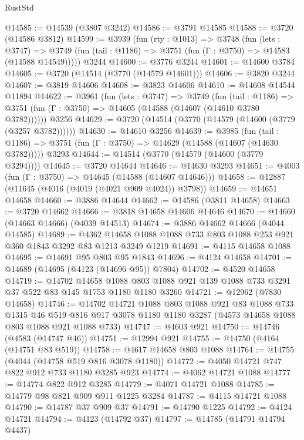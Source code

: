 \begin{lexlean}{RustStd}
\begin{coremodule}
@14585 := @14539 (@3807 @3242)
@14586 := @3791 @14585
@14588 := @3720 (@14586 @3812)
@14599 := @3939
    (fun (rty : @1013) =>
    @3748
      (fun (lets : @3747) =>
      @3749 (fun (tail : @1186) => @3751 (fun (Γ : @3750) => @14583 (@14588 @14549)))))
    @3244
@14600 := @3776 @3244
@14601 := @14600 @3784
@14605 := @3720 (@14514 (@3770 (@14579 @14601)))
@14606 := @3820 @3244
@14607 := @3819 @14606
@14608 := @3823 @14606
@14610 := @14608 @14544 @11894
@14622 := @3961
    (fun (lets : @3747) =>
    @3749
      (fun (tail : @1186) =>
      @3751 (fun (Γ : @3750) => @14605 (@14588 (@14607 (@14610 @3780 @3782))))))
    @3256
@14629 := @3720 (@14514 (@3770 (@14579 (@14600 (@3779 (@3257 @3782))))))
@14630 := @14610 @3256
@14639 := @3985
    (fun (tail : @1186) => @3751 (fun (Γ : @3750) => @14629 (@14588 (@14607 (@14630 @3782)))))
    @3293
@14644 := @14514 (@3770 (@14579 (@14600 (@3779 @3294))))
@14645 := @3720 @14644
@14646 := @14630 @3293
@14651 := @4003 (fun (Γ : @3750) => @14645 (@14588 (@14607 @14646)))
@14658 := @12887 (@11645 (@4016 (@4019 (@4021 @909 @4024)) @3798))
@14659 := @14651 @14658
@14660 := @3886 @14644
@14662 := @14586 (@3811 @14658)
@14663 := @3720 @14662
@14666 := @3818 @14658 @14606 @14646
@14670 := @14660 (@14663 @14666) (@4039 @14513)
@14674 := @3886 @14662 @14666 (@4044 @14585)
@14689 := @4362 @14658 @1088 @1088 @733 @803 @1088 @253 @921 @360 @1843 @3292 @83 @1213 @3249 @1219
@14691 := @4115 @14658 @1088
@14695 := @14691 @95 @803 @95 @1843
@14696 := @4124 @14658
@14701 := @14689 (@14695 (@4123 (@14696 @95)) @7804)
@14702 := @4520 @14658
@14719 := @14702
    @14658
    @1088
    @803
    @1088
    @921
    @139
    @1088
    @733
    @3291
    @37
    @522
    @83
    @145
    @1753
    @1180
    @1180
    @3260
@14721 := @12962 (@7830 @14658)
@14746 := @14702
    @14721
    @1088
    @803
    @1088
    @921
    @83
    @1088
    @733
    @1315
    @46
    @519
    @816
    @917
    @3078
    @1180
    @1180
    @3287
    (@4573 @14658 @1088 @803 @1088 @921 @1088 @733)
@14747 := @4603 @921
@14750 := @14746 (@4583 (@14747 @46))
@14751 := @12994 @921
@14755 := @14750 (@4164 (@14751 @83 @519))
@14758 := @4617 @14658 @803 @1088
@14764 := @14755 (@4044 (@14758 @519 @816 @3078 @1180))
@14772 := @4050 @14721 @747 @822 @912 @733 @1180 @3285 @923
@14774 := @4062 @14721 @1088
@14777 := @14774 @822 @912 @3285
@14779 := @4071 @14721 @1088
@14785 := @14779 @98 @821 @909 @911 @1225 @3284
@14787 := @4115 @14721 @1088
@14790 := @14787 @37 @909 @37
@14791 := @14790 @1225
@14792 := @4124 @14721
@14794 := @4123 (@14792 @37)
@14797 := @14785 (@14791 @14794 @4437)

\end{coremodule}
\end{lexlean}
